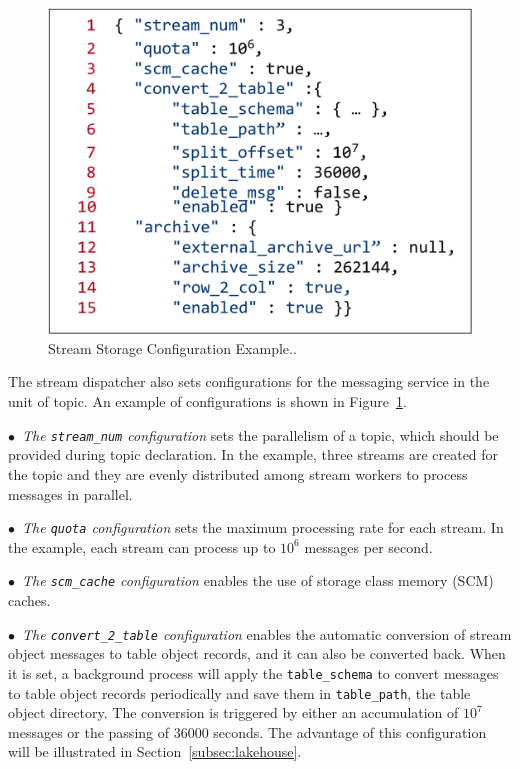 \begin{figure}[htbp]
	\vspace{-1em}
	\includegraphics[scale=0.33]{figures/config}
	\centering
	\vspace{-1em}
	\caption{Stream Storage Configuration Example..}
	\label{fig:config}
	\vspace{-1.5em}
\end{figure}


The stream dispatcher also sets configurations for the messaging service in the unit of topic. An example of  configurations is shown in Figure~\ref{fig:config}.



$\bullet$~\textit{The \texttt{stream\_num} configuration} sets the parallelism of a topic, which should be provided during topic declaration. In the example, three streams are created for the topic and they are evenly distributed among stream workers to process messages in parallel.

$\bullet$~\textit{The \texttt{quota} configuration} sets the maximum processing rate for each stream. In the example, each stream can process up to $10^6$ messages per second.

$\bullet$~\textit{The \texttt{scm\_cache} configuration} enables the use of storage class memory (SCM) caches.

$\bullet$~\textit{The \texttt{convert\_2\_table} configuration} enables the automatic conversion of stream object messages to table object records, and it can also be converted back. When it is set, a background process will apply the \texttt{table\_schema} to convert messages to table object records periodically and save them in \texttt{table\_path}, \ie the table object directory. The conversion is triggered by either an accumulation of $10^7$ messages or the passing of 36000 seconds.  The advantage of this configuration will be illustrated in Section~\ref{subsec:lakehouse}.





